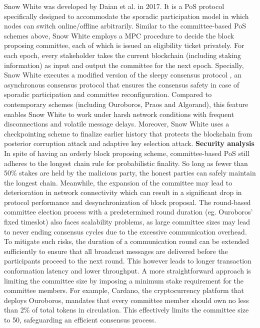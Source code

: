 Snow White was developed by Daian et al.  in 2017. It
is a PoS protocol specifically designed to accommodate the sporadic participation model in which nodes can switch online/offline arbitrarily. Similar to the committee-based PoS schemes above, Snow White employs a MPC procedure to decide the block proposing committee, each of which is issued an eligibility ticket privately. For each epoch, every stakeholder takes the current blockchain (including staking information) as input and output the committee for the next epoch. Specially, Snow White executes a modified version of the sleepy consensus protocol , an asynchronous consensus protocol that ensures the consensus safety in case of sporadic participation and committee reconfiguration. Compared to contemporary schemes (including Ouroboros, Praos and Algorand), this feature enables Snow White to work under harsh network conditions with frequent disconnections and volatile message delays. Moreover, Snow White uses a checkpointing scheme to finalize earlier history that protects the blockchain from posterior corruption attack  and adaptive key selection attack.
\textbf{Security analysis} In spite of having an orderly block proposing scheme, committee-based PoS still adheres to the longest chain rule for probabilistic finality. So long as fewer than 50\% stakes are held by the malicious party, the honest parties can safely maintain the longest chain. 
Meanwhile, the expansion of the committee may lead to deterioration in network connectivity which can result in a significant drop in protocol performance and desynchronization of block proposal. The round-based committee election process with a predetermined round duration (eg. Ouroboros' fixed timeslot) also faces scalability problems, as large committee sizes may lead to never ending consensus cycles due to the excessive communication overhead.
To mitigate such risks, the duration of a communication round can be extended sufficiently to ensure that all broadcast messages are delivered before the participants proceed to the next round.
This however leads to longer transaction conformation latency and lower throughput. A more straightforward approach is limiting the committee size by imposing a minimum stake requirement for the committee members. For example, Cardano, the cryptocurrency platform that deploys Ouroboros, mandates that every committee member should own no less than 2\% of total tokens in circulation. This effectively limits the committee size to 50, safeguarding an efficient consensus process.

